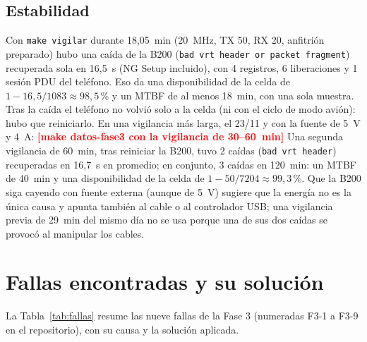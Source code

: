 \documentclass[conference]{IEEEtran}
\newcommand{\pendiente}[1]{\textcolor{red}{\textbf{[#1]}}}
\providecommand{\datosvigilar}{\pendiente{make datos-fase3 con la vigilancia de 30--60~min}}
\begin{document}
\subsection{Estabilidad}
Con \texttt{make vigilar} durante 18{,}05~min (20~MHz, TX 50, RX 20, anfitrión preparado) hubo una caída de la B200 (\texttt{bad vrt header or packet fragment}) recuperada sola en 16{,}5~s (NG Setup incluido), con 4 registros, 6 liberaciones y 1 sesión PDU del teléfono. Eso da una disponibilidad de la celda de $1-16{,}5/1083 \approx 98{,}5$\,\% y un MTBF de al menos 18~min, con una sola muestra. Tras la caída el teléfono no volvió solo a la celda (ni con el ciclo de modo avión): hubo que reiniciarlo. En una vigilancia más larga, el 23/11 y con la fuente de 5~V y 4~A: \datosvigilar{} Una segunda vigilancia de 60~min, tras reiniciar la B200, tuvo 2 caídas (\texttt{bad vrt header}) recuperadas en 16{,}7~s en promedio; en conjunto, 3 caídas en 120~min: un MTBF de 40~min y una disponibilidad de la celda de $1-50/7204 \approx 99{,}3$\,\%. Que la B200 siga cayendo con fuente externa (aunque de 5~V) sugiere que la energía no es la única causa y apunta también al cable o al controlador USB; una vigilancia previa de 29~min del mismo día no se usa porque una de sus dos caídas se provocó al manipular los cables.

\section{Fallas encontradas y su solución}
\label{sec:fallas}

La Tabla~\ref{tab:fallas} resume las nueve fallas de la Fase 3 (numeradas F3-1 a F3-9 en el repositorio), con su causa y la solución aplicada.
\end{document}
